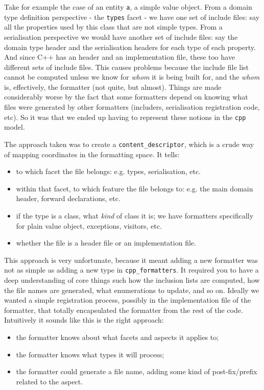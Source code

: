 \documentclass[11pt]{article}
\begin{document}
\begin{enumerate}
\begin{enumerate}
\begin{enumerate}
\begin{enumerate}
Take for example the case of an entity \texttt{a}, a simple value
object. From a domain type definition perspective - the \texttt{types}
facet - we have one set of include files: say all the properties used
by this class that are not simple types. From a serialisation
perspective we would have another set of include files: say the domain
type header and the serialisation headers for each type of each
property. And since C++ has an header and an implementation file,
these too have different sets of include files. This causes problems
because the include file list cannot be computed unless we know for
\emph{whom} it is being built for, and the \emph{whom} is, effectively, the
formatter (not quite, but almost). Things are made considerably worse
by the fact that some formatters depend on knowing what files were
generated by other formatters (includers, serialisation registration
code, etc). So it was that we ended up having to represent these
notions in the \texttt{cpp} model.

The approach taken was to create a \texttt{content\_descriptor}, which is a
crude way of mapping coordinates in the formatting space. It tells:

\begin{itemize}
\item to which facet the file belongs: e.g. types, serialisation, etc.
\item within that facet, to which feature the file belongs to: e.g. the
main domain header, forward declarations, etc.
\item if the type is a class, what \emph{kind} of class it is; we have
formatters specifically for plain value object, exceptions,
visitors, etc.
\item whether the file is a header file or an implementation file.
\end{itemize}

This approach is very unfortunate, because it meant adding a new
formatter was not as simple as adding a new type in
\texttt{cpp\_formatters}. It required you to have a deep understanding of core
things such how the inclusion lists are computed, how the file names
are generated, what enumerations to update, and so on. Ideally we
wanted a simple registration process, possibly in the implementation
file of the formatter, that totally encapsulated the formatter from
the rest of the code. Intuitively it sounds like this is the right
approach:

\begin{itemize}
\item the formatter knows about what facets and aspects it applies to;
\item the formatter knows what types it will process;
\item the formatter could generate a file name, adding some kind of
post-fix/prefix related to the aspect.
\end{itemize}


\end{enumerate}
\end{enumerate}
\end{enumerate}
\end{enumerate}
\end{document}
